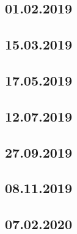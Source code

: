 \documentclass[a4paper,12p]{article}
\begin{document}
	\newpage
	\subsection{01.02.2019}
	
	
	
	
	
	\subsection{15.03.2019}
		
	
	
	
	
	\newpage	
	\subsection{17.05.2019}
	
	
	
	

	\newpage
	\subsection{12.07.2019}
	
	
	
	
	
	\newpage
	\subsection{27.09.2019}
	\subsection{08.11.2019}
	\subsection{07.02.2020}
\end{document}
